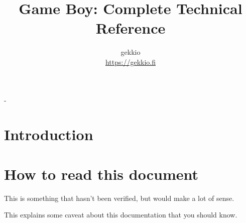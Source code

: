 \documentclass[a4paper, draft, oneside]{memoir}
\title{Game Boy: Complete Technical Reference}
\author{gekkio\\ \url{https://gekkio.fi}}
\begin{document}
\hypersetup{pageanchor=false}

\begin{titlingpage}
  \calccentering{\unitlength}
  \setlength{\droptitle}{80pt}
  \begin{adjustwidth*}{\unitlength}{-\unitlength}
    \maketitle
  \end{adjustwidth*}
\end{titlingpage}

\hypersetup{pageanchor=true}

\tableofcontents

\chapter*{Introduction}

\chapter*{How to read this document}

\begin{speculation}
  This is something that hasn't been verified, but would make a lot of sense.
\end{speculation}

\begin{caveat}
  This explains some caveat about this documentation that you should know.
\end{caveat}
\end{document}
